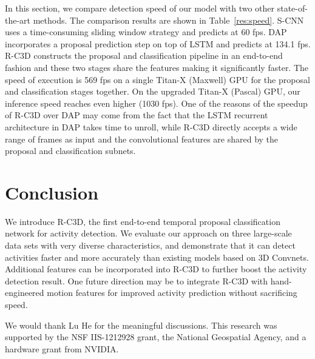 \documentclass[10pt,twocolumn,letterpaper]{article}
\newcommand{\modelname}[0]{R-C3D }
\begin{document}
In this section, we compare detection speed of our model with two other state-of-the-art methods.
The comparison results are shown in Table~\ref{res:speed}.
S-CNN~\cite{shou2016temporal} uses a time-consuming sliding window strategy and predicts at 60 fps.
DAP~\cite{escorcia2016daps} incorporates a proposal prediction step on top of LSTM and predicts at 134.1 fps.
\modelname constructs the proposal and classification pipeline in an end-to-end fashion and these two stages share the features making it significantly faster.
The speed of execution is 569 fps on a single Titan-X (Maxwell) GPU for the proposal and classification stages together.
On the upgraded Titan-X (Pascal) GPU, our inference speed reaches even higher (1030 fps).
One of the reasons of the speedup of \modelname over DAP may come from the fact that the LSTM recurrent architecture in DAP takes time to unroll, while \modelname directly accepts a wide range of frames as input and the convolutional features are shared by the proposal and classification subnets. \section{Conclusion} 
We introduce R-C3D, the first end-to-end temporal proposal classification network for activity detection.
We evaluate our approach on three large-scale data sets with very diverse characteristics, and demonstrate that it can detect activities faster and more accurately than existing models based on 3D Convnets.
Additional features can be incorporated into \modelname to further boost the activity detection result.
One future direction may be to integrate \modelname with hand-engineered motion features for improved activity prediction without sacrificing speed.

 We would thank Lu He for the meaningful discussions. This research was supported by the NSF IIS-1212928 grant, the National Geospatial Agency, and a hardware grant from NVIDIA.
 







{\small


}
\end{document}
